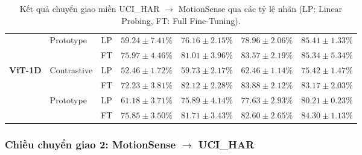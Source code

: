 \begin{table}[H]
\begin{tabularx}{\textwidth}{llcXXXX}
  \cmidrule(lr){2-7}
  & \multirow{2}{*}{Prototype}   & LP & $59.24 \pm 7.41\%$ & $76.16 \pm 2.15\%$ & $78.96 \pm 2.06\%$ & $85.41 \pm 1.33\%$ \\
  &                              & FT & $75.97 \pm 4.46\%$ & $81.01 \pm 3.96\%$ & $83.57 \pm 2.19\%$ & $85.34 \pm 5.34\%$ \\
\midrule
\multirow{4}{*}{\textbf{ViT-1D}} 
  & \multirow{2}{*}{Contrastive} & LP & $52.46 \pm 1.72\%$ & $59.73 \pm 2.17\%$ & $62.46 \pm 1.14\%$ & $75.42 \pm 1.47\%$ \\
  &                              & FT & $72.23 \pm 3.81\%$ & $82.12 \pm 2.28\%$ & $83.88 \pm 2.12\%$ & $83.17 \pm 2.03\%$ \\
  \cmidrule(lr){2-7}
  & \multirow{2}{*}{Prototype}   & LP & $61.18 \pm 3.71\%$ & $75.89 \pm 4.14\%$ & $77.63 \pm 2.93\%$ & $80.21 \pm 0.23\%$ \\
  &                              & FT & $75.85 \pm 3.50\%$ & $81.71 \pm 3.43\%$ & $82.60 \pm 2.65\%$ & $84.30 \pm 1.13\%$ \\
\bottomrule
\end{tabularx}
\caption{Kết quả chuyển giao miền UCI\_HAR $\rightarrow$ MotionSense qua các tỷ lệ nhãn (LP: Linear Probing, FT: Full Fine-Tuning).}
\end{table}

\subsubsection{Chiều chuyển giao 2: MotionSense $\rightarrow$ UCI\_HAR}

